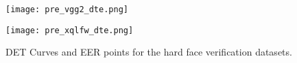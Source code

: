 \documentclass[class=report, crop=false, a4paper, 12pt]{standalone}
\begin{document}
  \begin{figure}[H]
    \begin{adjustbox}{center, minipage=1.2\textwidth, margin=0cm -0.1cm 0cm -0.1cm}  %
        \begin{minipage}[c]{0.49\textwidth}
            \centering
            \texttt{[image: pre\_vgg2\_dte.png]}
            \label{fig:dte_vgg2_a}
        \end{minipage}
        \hfill
        \begin{minipage}[c]{0.49\textwidth}
            \centering
            \texttt{[image: pre\_xqlfw\_dte.png]}
            \label{fig:dte_xqlfw_b}
        \end{minipage}
    \end{adjustbox}
    \vspace{-0.4cm}
    \caption{DET Curves and EER points for the hard face verification datasets.}
    \label{fig:dte_hard}
\end{figure}
\end{document}
